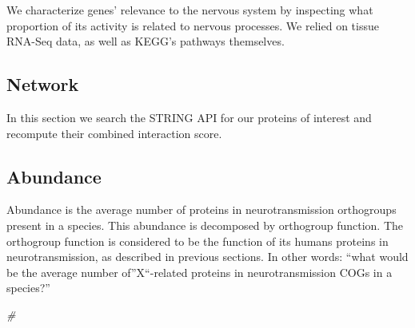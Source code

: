 \documentclass[
]{article}
\newenvironment{Shaded}{\begin{snugshade}}{\end{snugshade}}
\newcommand{\CommentTok}[1]{\textcolor[rgb]{0.33,0.33,0.33}{\textit{#1}}}
\renewenvironment{Shaded}{\scriptsize\begin{blackbox}}{\end{blackbox}}
\begin{document}
We characterize genes' relevance to the nervous system by inspecting
what proportion of its activity is related to nervous processes. We
relied on tissue RNA-Seq data, as well as KEGG's pathways themselves.


\hypertarget{network-1}{%
\subsection{Network}\label{network-1}}

In this section we search the STRING API for our proteins of interest
and recompute their combined interaction score.


\hypertarget{abundance}{%
\subsection{Abundance}\label{abundance}}

Abundance is the average number of proteins in neurotransmission
orthogroups present in a species. This abundance is decomposed by
orthogroup function. The orthogroup function is considered to be the
function of its humans proteins in neurotransmission, as described in
previous sections. In other words: ``what would be the average number
of''X``-related proteins in neurotransmission COGs in a species?''


\begin{Shaded}
\begin{Highlighting}[numbers=left,,]
\CommentTok{#}
\end{Highlighting}
\end{Shaded}
\end{document}
